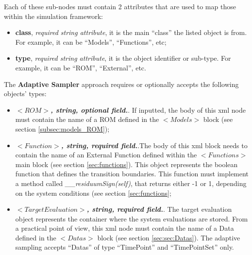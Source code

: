 \begin{itemize}
Each of these sub-nodes  must contain 2 attributes that are used to map those within the simulation framework:
   \begin{itemize}
     \item \textbf{class}, \textit{required string attribute}, it is the main ``class'' the listed object is from. For example, it can be ``Models'', ``Functions'', etc;
     \item \textbf{type},  \textit{required string attribute}, it is the object identifier or sub-type. For example, it can be ``ROM'', ``External'', etc.
    \end{itemize}
The \textbf{Adaptive Sampler} approach requires or optionally accepts the following objects' types:
   \begin{itemize}
     \item $<ROM>$\textbf{\textit{, string, optional  field.}}. If inputted, the body of this xml node must contain the name of a ROM defined in the $<Models>$ block (see section \ref{subsec:models_ROM});
       \item $<Function>$\textbf{\textit{, string, required field.}}.The body of this xml block needs to contain the name of an External Function defined within the $<Functions>$ main block (see section \ref{sec:functions}). This object represents the boolean function that defines the transition boundaries. This function must implement a method called \textit{\_\_residuumSign(self)}, that returns either -1 or 1, depending on the system conditions (see section \ref{sec:functions};
        \item $<TargetEvaluation>$\textbf{\textit{, string, required field.}}. The target evaluation object represents the container where the system evaluations are stored. From a practical point of view, this xml node must contain the name of a Data defined in the $<Datas>$ block (see section \ref{sec:sec:Datas}). The adaptive sampling accepts ``Datas'' of type ``TimePoint''  and ``TimePointSet'' only.
    \end{itemize}
    
\end{itemize}



